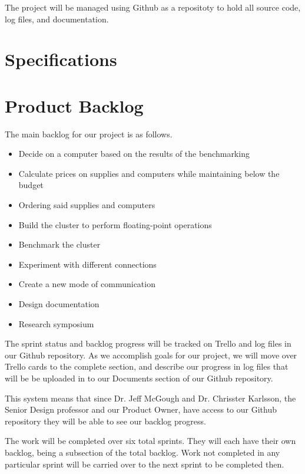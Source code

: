 The project will be managed using Github as a repositoty to hold all source code, log files, and documentation. 


\section{Specifications}

\section{Product Backlog}

The main backlog for our project is as follows.

\begin{itemize}
	\item Decide on a computer based on the results of the benchmarking
	\item Calculate prices on supplies and computers while maintaining below the budget
	\item Ordering said supplies and computers
	\item Build the cluster to perform floating-point operations
	\item Benchmark the cluster
	\item Experiment with different connections
	\item Create a new mode of communication
	\item Design documentation
	\item Research symposium
\end{itemize}

The sprint status and backlog progress will be tracked on Trello and log files in our Github repository. As we accomplish goals for our project, we will move over Trello cards to the complete section, and describe our progress in log files that will be be uploaded in to our Documents section of our Github repository.

This system means that since Dr. Jeff McGough and Dr. Chrisster Karlsson, the Senior Design professor and our Product Owner, have access to our Github repository they will be able to see our backlog progress.

The work will be completed over six total sprints. They will each have their own backlog, being a subsection of the total backlog. Work not completed in any particular sprint will be carried over to the next sprint to be completed then.

